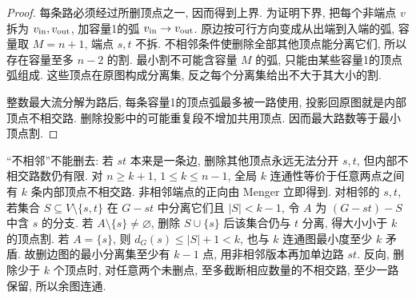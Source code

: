 \begin{proof}
每条路必须经过所删顶点之一, 因而得到上界. 为证明下界, 把每个非端点 $v$ 拆为 $v_{\rm in},v_{\rm out}$, 加容量1的弧 $v_{\rm in}\to v_{\rm out}$. 原边按可行方向变成从出端到入端的弧, 容量取 $M=n+1$, 端点 $s,t$ 不拆. 不相邻条件使删除全部其他顶点能分离它们, 所以存在容量至多 $n-2$ 的割. 最小割不可能含容量 $M$ 的弧, 只能由某些容量1的顶点弧组成. 这些顶点在原图构成分离集, 反之每个分离集给出不大于其大小的割.

整数最大流分解为路后, 每条容量1的顶点弧最多被一路使用, 投影回原图就是内部顶点不相交路. 删除投影中的可能重复段不增加共用顶点. 因而最大路数等于最小顶点割.
\end{proof}
“不相邻”不能删去: 若 $st$ 本来是一条边, 删除其他顶点永远无法分开 $s,t$, 但内部不相交路数仍有限. 对 $n\ge k+1$, $1\le k\le n-1$, 全局 $k$ 连通性等价于任意两点之间有 $k$ 条内部顶点不相交路. 非相邻端点的正向由 Menger 立即得到. 对相邻的 $s,t$, 若集合 $S\subseteq V\setminus\{s,t\}$ 在 $G-st$ 中分离它们且 $|S|<k-1$, 令 $A$ 为 $(G-st)-S$ 中含 $s$ 的分支. 若 $A\setminus\{s\}\ne\varnothing$, 删除 $S\cup\{s\}$ 后该集合仍与 $t$ 分离, 得大小小于 $k$ 的顶点割. 若 $A=\{s\}$, 则 $d_G(s)\le|S|+1<k$, 也与 $k$ 连通图最小度至少 $k$ 矛盾. 故删边图的最小分离集至少有 $k-1$ 点, 用非相邻版本再加单边路 $st$. 反向, 删除少于 $k$ 个顶点时, 对任意两个未删点, 至多截断相应数量的不相交路, 至少一路保留, 所以余图连通.

